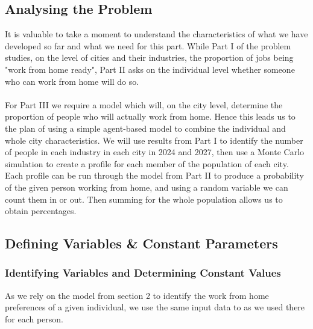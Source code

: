         \subsection{Analysing the Problem}  
            It is valuable to take a moment to understand the characteristics of what we have developed so far and what we need for this part. While Part I of the problem studies, on the level of cities and their industries, the proportion of jobs being "work from home ready", Part II asks on the individual level whether someone who can work from home will do so. \\ \\ For Part III we require a model which will, on the city level, determine the proportion of people who will actually work from home. Hence this leads us to the plan of using a simple agent-based model to combine the individual and whole city characteristics. We will use results from Part I to identify the number of people in each industry in each city in 2024 and 2027, then use a Monte Carlo simulation to create a profile for each member of the population of each city. Each profile can be run through the model from Part II to produce a probability of the given person working from home, and using a random variable we can count them in or out. Then summing for the whole population allows us to obtain percentages. 
            
        \subsection{Defining Variables \& Constant Parameters} 
            \subsubsection{Identifying Variables and Determining Constant Values}
                As we rely on the model from section 2 to identify the work from home preferences of a given individual, we use the same input data to as we used there for each person. 
                
